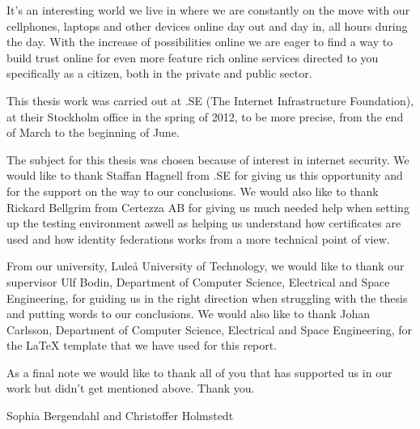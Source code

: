 It's an interesting world we live in where we are constantly on the move with our cellphones, laptops and other devices online day out and day in, all hours during the day.
With the increase of possibilities online we are eager to find a way to build trust online for even more feature rich online services directed to you specifically as a citizen, both in the private and public sector.

This thesis work was carried out at .SE (The Internet Infrastructure Foundation), at their Stockholm office in the spring of 2012, to be more precise, from the end of March to the beginning of June.

The subject for this thesis was chosen because of interest in internet security.
We would like to thank Staffan Hagnell from .SE for giving us this opportunity and for the support on the way to our conclusions.
We would also like to thank Rickard Bellgrim from Certezza AB for giving us much needed help when setting up the testing environment aswell as helping us understand how certificates are used and how identity federations works from a more technical point of view.

From our university, Lule\r{a} University of Technology, we would like to thank our supervisor Ulf Bodin, Department of Computer Science, Electrical and Space Engineering, for guiding us in the right direction when struggling with the thesis and putting words to our conclusions.
We would also like to thank Johan Carlsson, Department of Computer Science, Electrical and Space Engineering, for the LaTeX template that we have used for this report. 

As a final note we would like to thank all of you that has supported us in our work but didn't get mentioned above.
Thank you.




%



\vspace*{2cm}%
\hfill Sophia Bergendahl and Christoffer Holmstedt
